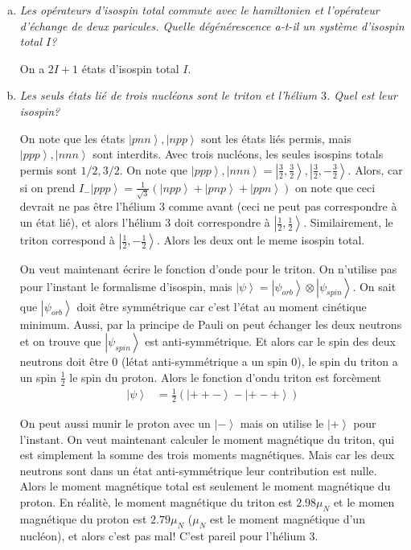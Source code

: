 \documentclass[10pt]{report}
\newcommand{\ket}[1]{\left|#1\right>}
\begin{document}
\begin{enumerate}[a)]
    \item \emph{Les op\'erateurs d'isospin total commute avec le hamiltonien et l'op\'erateur d'\'echange de deux paricules. Quelle d\'eg\'en\'erescence a-t-il un syst\`eme d'isospin total $I$?}

        On a $2I+1$ \'etats d'isospin total $I$.

    \item \emph{Les seuls \'etats li\'e de trois nucl\'eons sont le triton et l'h\'elium $3$. Quel est leur isospin?}

        On note que les \'etats $\ket{pnn}, \ket{npp}$ sont les \'etats li\'es permis, mais $\ket{ppp}, \ket{nnn}$ sont interdits. Avec trois nucl\'eons, les seules isospins totals permis sont $1/2, 3/2$. On note que $\ket{ppp}, \ket{nnn} = \ket{\frac{3}{2}, \frac{3}{2}}, \ket{\frac{3}{2}, -\frac{3}{2}}$. 
        Alors, car si on prend $I_- \ket{ppp} = \frac{1}{\sqrt{3}}\left( \ket{npp} + \ket{pnp} + \ket{ppn} \right)$ on note que ceci devrait ne pas \^etre l'h\'elium $3$ comme avant (ceci ne peut pas correspondre \`a un \'etat li\'e), et alors l'h\'elium $3$ doit correspondre \`a $\ket{\frac{1}{2}, \frac{1}{2}}$. Similairement, le triton correspond \`a $\ket{\frac{1}{2}, -\frac{1}{2}}$. Alors les deux ont le meme isospin total.

        On veut maintenant \'ecrire le fonction d'onde pour le triton. On n'utilise pas pour l'instant le formalisme d'isospin, mais $\ket{\psi} = \ket{\psi_{orb}} \otimes \ket{\psi_{spin}}$. On sait que $\ket{\psi_{orb}}$ doit \^etre symm\'etrique car c'est l'\'etat au moment cin\'etique minimum. Aussi, par la principe de Pauli on peut \'echanger les deux neutrons et on trouve que $\ket{\psi_{spin}}$ est anti-symm\'etrique. Et alors car le spin des deux neutrons doit \^etre $0$ (l\'etat anti-symm\'etrique a un spin $0$), le spin du triton a un spin $\frac{1}{2}$ le spin du proton. Alors le fonction d'ondu triton est forc\`ement
        \begin{align}
            \ket{\psi} &= \frac{1}{2}\left( \ket{++-} - \ket{+- +} \right)
        \end{align}

        On peut aussi munir le proton avec un $\ket{-}$ mais on utilise le $\ket{+}$ pour l'instant. On veut maintenant calculer le moment magn\'etique du triton, qui est simplement la somme des trois moments magn\'etiques. Mais car les deux neutrons sont dans un \'etat anti-symm\'etrique leur contribution est nulle. Alors le moment magn\'etique total est seulement le moment magn\'etique du proton. En r\'ealit\`e, le moment magn\'etique du triton est $2.98\mu_N$ et le momen magn\'etique du proton est $2.79\mu_N$ ($\mu_N$ est le moment magn\'etique d'un nucl\'eon), et alors c'est pas mal! C'est pareil pour l'h\'elium $3$.
\end{enumerate}
\end{document}
